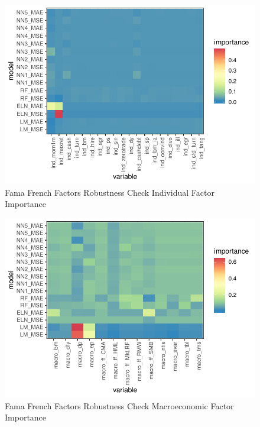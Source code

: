\documentclass{article}
\begin{document}


\FloatBarrier


\begin{figure}
	\includegraphics[]{../../Results/empirical_ff/empirical_all_sample_vi_ind.pdf}
	\caption{Fama French Factors Robustness Check Individual Factor Importance}
\end{figure}

\begin{figure}
	\includegraphics[]{../../Results/empirical_ff/empirical_sample_all_vi_macro.pdf}
	\caption{Fama French Factors Robustness Check Macroeconomic Factor Importance}
\end{figure}
\end{document}

